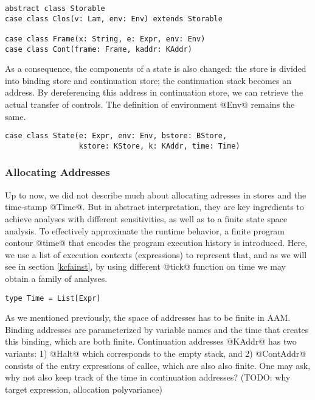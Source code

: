 \documentclass[acmsmall,review,anonymous]{acmart}\settopmatter{printfolios=true,printccs=false,printacmref=false}
\begin{document}
\begin{lstlisting}
abstract class Storable 
case class Clos(v: Lam, env: Env) extends Storable

case class Frame(x: String, e: Expr, env: Env)
case class Cont(frame: Frame, kaddr: KAddr)
\end{lstlisting}

As a consequence, the components of a state is also changed: 
the store is divided into binding store and continuation store;
the continuation stack becomes an address.
By dereferencing this address in continuation store, we can retrieve the 
actual transfer of controls. The definition of environment @Env@
remains the same.

\begin{lstlisting}
case class State(e: Expr, env: Env, bstore: BStore, 
                 kstore: KStore, k: KAddr, time: Time)
\end{lstlisting}

\subsubsection{Allocating Addresses}
Up to now, we did not describe much about allocating adresses in stores and the 
time-stamp @Time@.
But in abstract interpretation, they are key ingredients to achieve 
analyses with different sensitivities, as well as to a finite state space analysis\cite{Gilray:2016:ACP:2951913.2951936}.
To effectively approximate the runtime behavior, a finite 
program contour @time@ that encodes the program execution history is introduced.
Here, we use a list of execution contexts (expressions) to represent that, and
as we will see in section \ref{kcfainst}, by using different @tick@
function on time we may obtain a family of analyses.

\begin{lstlisting}
type Time = List[Expr]
\end{lstlisting}

As we mentioned previously, the space of addresses has to be finite in AAM.
Binding addresses are parameterized by variable names and the time that creates this binding,
which are both finite.
Continuation addresses @KAddr@ has two variants: 
1) @Halt@ which corresponds to the empty stack, and
2) @ContAddr@ consists of the entry expressions of callee, which are also also
finite.
One may ask, why not also keep track of the time in continuation addresses?
(TODO: why target expression, allocation polyvariance)
\end{document}
